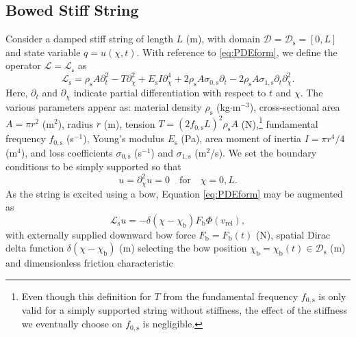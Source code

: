 \documentclass[dvipsnames, pdftex]{article}
\def\SWcomment[#1]{\textcolor{Bittersweet}{#1}}
\def\MDcomment[#1]{\textcolor{Blue}{#1}}
\def\stringx{\chi}
\def\ugen{q}
\def\us{u}
\begin{document}
\subsection{Bowed Stiff String}
Consider a damped stiff string of length $L$ (m), with domain $\mathcal{D} = \mathcal{D}_\text{s} = [0,L]$ and state variable $\ugen = \us(\stringx,t)$.  
With reference to \eqref{eq:PDEform}, we define the operator $\mathcal{L} = \mathcal{L_\text{s}}$ as
\begin{equation}
    \mathcal{L}_\text{s} = \rho_\text{s} A \partial_t^2 - T\partial_\stringx^2 + E_\text{s}I\partial_\stringx^4+2\rho_\text{s} A\sigma_{0,\text{s}}\partial_t-2\rho_\text{s} A\sigma_{1,\text{s}}\partial_t\partial_\stringx^2.
\end{equation}
Here, $\partial_{t}$ and $\partial_{\stringx}$ indicate partial differentiation with respect to $t$ and $\stringx$. The various parameters appear as: material density $\rho_\text{s}$ (kg$\cdot$m$^{-3}$), cross-sectional area $A = \pi r^2$ (m$^2$), radius $r$ (m), tension $T = (2f_{0,\text{s}}L)^2\rho_\text{s}A$ (N),\footnote{Even though this definition for $T$ from the fundamental frequency $f_{0,\text{s}}$ is only valid for a simply supported string without stiffness, the effect of the stiffness we eventually choose on $f_{0,\text{s}}$ is negligible.} %
fundamental frequency $f_{0,\text{s}}$ (s$^{-1}$), Young's modulus $E_\text{s}$ (Pa), area moment of inertia $I=\pi r^4 / 4$ (m$^4$), and loss coefficients $\sigma_{0,\text{s}}$ (s$^{-1}$) and $\sigma_{1,\text{s}}$ (m$^2$/s). We set the boundary conditions to be simply supported so that
\begin{equation}\label{eq:boundary}
    \us = \partial_\stringx^2\us = 0 \quad \text{for} \quad \stringx = 0, L.
\end{equation}
As the string is excited using a bow, Equation \eqref{eq:PDEform} may be augmented as \cite{bilbao2009numerical}
\begin{equation}\label{eq:bowedString}
    \mathcal{L}_\text{s}\us = -\delta(\stringx-\stringx_\text{b})F_\text{b}\Phi(v_\text{rel}),
\end{equation}
with externally supplied downward bow force $F_\text{b} = F_\text{b}(t)$ (N), spatial Dirac delta function $\delta(\stringx-\stringx_\text{b})$ (m) selecting the bow position $\stringx_\text{b} = \stringx_\text{b}(t)\in \mathcal{D}_\text{s}$ (m) and dimensionless friction characteristic
\end{document}
